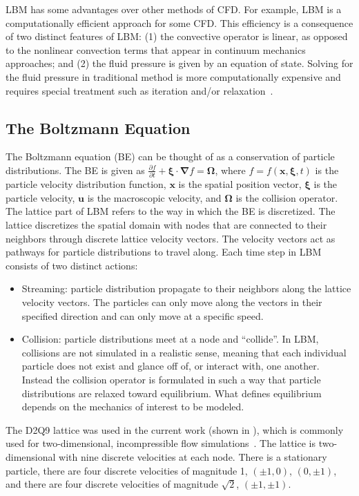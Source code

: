 \documentclass[pdftex,ms]{pittetd}
\newcommand{\pos}{\mathbf{x}}
\newcommand{\pvel}{\boldsymbol{\xi}}
\newcommand{\mvel}{\mathbf{u}}
\newcommand{\colop}{\boldsymbol{\Omega}}
\newcommand{\grad}{\boldsymbol{\nabla}}
\begin{document}
LBM has some advantages over other methods of CFD.
For example, LBM is a computationally efficient approach for some CFD.
This efficiency is a consequence of two distinct features of LBM: (1) the convective operator is linear, as opposed to the nonlinear convection terms that appear in continuum mechanics approaches; and (2) the fluid pressure is given by an equation of state.
Solving for the fluid pressure in traditional method is more computationally expensive and requires special treatment such as iteration and/or relaxation~\cite{chen1998lattice}.

\subsection{The Boltzmann Equation}
The Boltzmann equation (BE) can be thought of as a conservation of particle distributions.
The BE is given as $\frac{\partial f}{\partial t} + \pvel \cdot \grad f = \colop$, where $f = f(\pos, \pvel, t)$ is the particle velocity distribution function, $\pos$ is the spatial position vector, $\pvel$ is the particle velocity, $\mvel$ is the macroscopic velocity, and $\colop$ is the collision operator.
The lattice part of LBM refers to the way in which the BE is discretized.
The lattice discretizes the spatial domain with nodes that are connected to their neighbors through discrete lattice velocity vectors.
The velocity vectors act as pathways for particle distributions to travel along.
Each time step in LBM consists of two distinct actions:

\begin{itemize}
\item Streaming: particle distribution propagate to their neighbors along the lattice velocity vectors.
The particles can only move along the vectors in their specified direction and can only move at a specific speed.
\item Collision: particle distributions meet at a node and ``collide''.
In LBM, collisions are not simulated in a realistic sense, meaning that each individual particle does not exist and glance off of, or interact with, one another.
Instead the collision operator is formulated in such a way that particle distributions are relaxed toward equilibrium.
What defines equilibrium depends on the mechanics of interest to be modeled.
\end{itemize}

The D2Q9 lattice was used in the current work (shown in ), which is commonly used for two-dimensional, incompressible flow simulations~\cite{Suc01}. %
The lattice is two-dimensional with nine discrete velocities at each node.
There is a stationary particle, there are four discrete velocities of magnitude 1, $(\pm1,0)$, $(0,\pm1)$, and there are four discrete velocities of magnitude $\sqrt{2}$, $(\pm1, \pm1)$.
\end{document}
